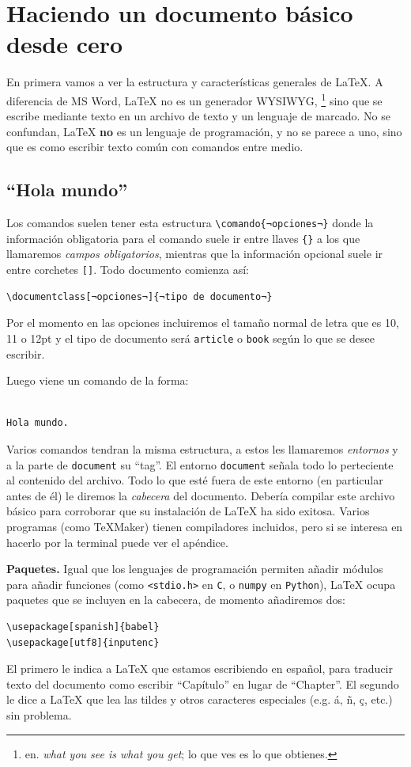 \chapter{Haciendo un documento básico desde cero}
En primera vamos a ver la estructura y características generales de \LaTeX{}.
A diferencia de MS Word, \LaTeX{} no es un generador WYSIWYG,%
\footnote{en. \textit{what you see is what you get}; lo que ves es lo que obtienes.}
sino que se escribe mediante texto en un archivo de texto y un lenguaje de marcado.
No se confundan, \LaTeX{} \textbf{no} es un lenguaje de programación, y no se parece a uno, sino que es como escribir texto común con comandos entre medio.

\section{``Hola mundo''}
Los comandos suelen tener esta estructura \lstinline|\comando{¬opciones¬}| donde la información obligatoria para el comando suele ir entre llaves \texttt{\{\}} a los que llamaremos \textit{campos obligatorios}, mientras que la información opcional suele ir entre corchetes \texttt{[]}. Todo documento comienza así:
\begin{lstlisting}
\documentclass[¬opciones¬]{¬tipo de documento¬}
\end{lstlisting}
Por el momento en las opciones incluiremos el tamaño normal de letra que es 10, 11 o 12pt y el tipo de documento será \texttt{article} o \texttt{book} según lo que se desee escribir.

Luego viene un comando de la forma:
\begin{lstlisting}

Hola mundo.

\end{lstlisting}
Varios comandos tendran la misma estructura, a estos les llamaremos \textit{entornos} y a la parte de \texttt{document} su ``tag''. El entorno \texttt{document} señala todo lo perteciente al contenido del archivo. Todo lo que esté fuera de este entorno (en particular antes de él) le diremos la \textit{cabecera} del documento. Debería compilar este archivo básico para corroborar que su instalación de \LaTeX{} ha sido exitosa. Varios programas (como TeXMaker) tienen compiladores incluidos, pero si se interesa en hacerlo por la terminal puede ver el apéndice.

\textbf{Paquetes.} Igual que los lenguajes de programación permiten añadir módulos para añadir funciones (como \texttt{<stdio.h>} en \texttt{C}, o \texttt{numpy} en \texttt{Python}), \LaTeX{} ocupa paquetes que se incluyen en la cabecera, de momento añadiremos dos:
\begin{lstlisting}
\usepackage[spanish]{babel}
\usepackage[utf8]{inputenc}
\end{lstlisting}
El primero le indica a \LaTeX{} que estamos escribiendo en español, para traducir texto del documento como escribir ``Capítulo'' en lugar de ``Chapter''. El segundo le dice a \LaTeX{} que lea las tildes y otros caracteres especiales (e.g. á, ñ, ç, etc.) sin problema.

